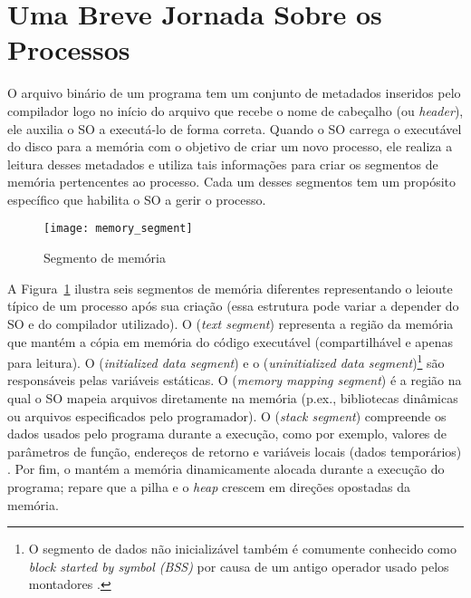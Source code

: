 \section{Uma Breve Jornada Sobre os Processos}
\label{sec:processos-e-threads}


O arquivo binário de um programa tem um conjunto de metadados inseridos pelo
compilador logo no início do arquivo que recebe o nome de cabeçalho (ou \textit{header}), ele
auxilia o SO a executá-lo de forma correta.  Quando o SO carrega o
executável do disco para a memória com o objetivo de criar um novo processo,
ele realiza a leitura desses metadados e utiliza tais informações para criar os
segmentos de memória pertencentes ao processo. Cada um desses segmentos tem um
propósito específico que habilita o SO a gerir o processo.

\begin{figure}[!h]
  \centering
  \texttt{[image: memory\_segment]} 
  \caption{Segmento de memória}
  \label{fig:memory_segment} 
\end{figure}

A Figura~\ref{fig:memory_segment} ilustra seis segmentos de memória diferentes
representando o leioute típico de um processo após sua criação (essa estrutura
pode variar a depender do SO e do compilador utilizado). O  (\emph{text segment}) representa a região da
memória que mantém a cópia em memória do código executável (compartilhável e
apenas para leitura). O 
(\emph{initialized data segment}) e o  (\emph{uninitialized data segment})\footnote{O segmento de dados
não inicializável também é comumente conhecido como \emph{block started by
symbol (BSS)} por causa de um antigo operador usado pelos montadores
\citep{gdb}.} são responsáveis pelas variáveis estáticas. O
 (\emph{memory mapping
segment}) é a região na qual o SO mapeia arquivos diretamente na memória (p.ex.,
bibliotecas dinâmicas ou arquivos especificados pelo programador). O
 (\emph{stack segment}) compreende os dados
usados pelo programa durante a execução, como por exemplo, valores de
parâmetros de função, endereços de retorno e variáveis locais (dados
temporários) \citep{silberschatz}. Por fim, o 
mantém a memória dinamicamente alocada durante a execução do programa; repare
que a pilha e o \emph{heap} crescem em direções opostadas da memória.

